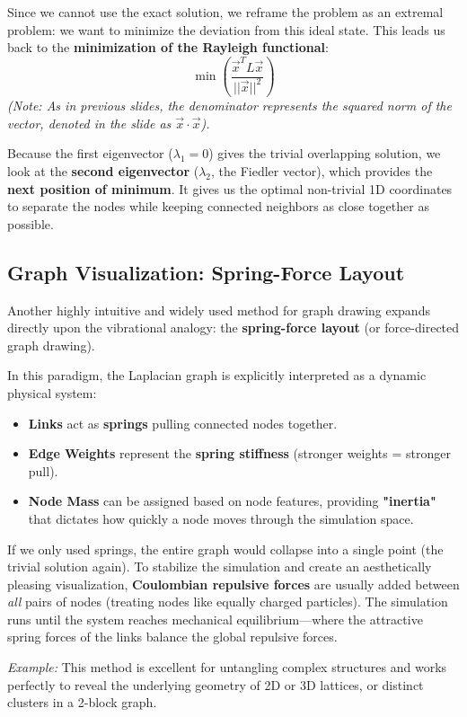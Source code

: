 Since we cannot use the exact solution, we reframe the problem as an extremal problem: we want to minimize the deviation from this ideal state. This leads us back to the \textbf{minimization of the Rayleigh functional}:
\[
    \min \left( \frac{\vec{x}^T L \vec{x}}{||\vec{x}||^2} \right)
\]
\textit{(Note: As in previous slides, the denominator represents the squared norm of the vector, denoted in the slide as \( \vec{x} \cdot \vec{x} \)).}

Because the first eigenvector (\( \lambda_1 = 0 \)) gives the trivial overlapping solution, we look at the \textbf{second eigenvector} (\( \lambda_2 \), the Fiedler vector), which provides the \textbf{next position of minimum}. It gives us the optimal non-trivial 1D coordinates to separate the nodes while keeping connected neighbors as close together as possible.

\subsection{Graph Visualization: Spring-Force Layout}
Another highly intuitive and widely used method for graph drawing expands directly upon the vibrational analogy: the \textbf{spring-force layout} (or force-directed graph drawing).

In this paradigm, the Laplacian graph is explicitly interpreted as a dynamic physical system:
\begin{itemize}
    \item \textbf{Links} act as \textbf{springs} pulling connected nodes together.
    \item \textbf{Edge Weights} represent the \textbf{spring stiffness} (stronger weights = stronger pull).
    \item \textbf{Node Mass} can be assigned based on node features, providing \textbf{"inertia"} that dictates how quickly a node moves through the simulation space.
\end{itemize}

If we only used springs, the entire graph would collapse into a single point (the trivial solution again). To stabilize the simulation and create an aesthetically pleasing visualization, \textbf{Coulombian repulsive forces} are usually added between \textit{all} pairs of nodes (treating nodes like equally charged particles).
The simulation runs until the system reaches mechanical equilibrium—where the attractive spring forces of the links balance the global repulsive forces.

\textit{Example:} This method is excellent for untangling complex structures and works perfectly to reveal the underlying geometry of 2D or 3D lattices, or distinct clusters in a 2-block graph.

